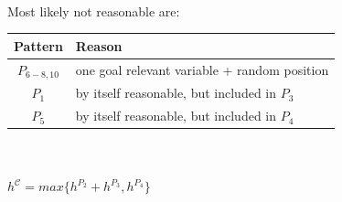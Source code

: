 \documentclass[11pt,a4paper]{article}
\begin{document}
\\
Most likely not reasonable are:\\
\begin{tabular}{c|l}
Pattern & Reason\\
\hline
$P_{6-8,10}$ & one goal relevant variable + random position\\
$P_1$ & by itself reasonable, but included in $P_3$\\
$P_5$ & by itself reasonable, but included in $P_4$\\
\end{tabular}\\
\\
$h^\mathscr{C}=max\{h^{P_2}+h^{P_3},h^{P_4}\}$\\

\label{lastpage}
\end{document}
